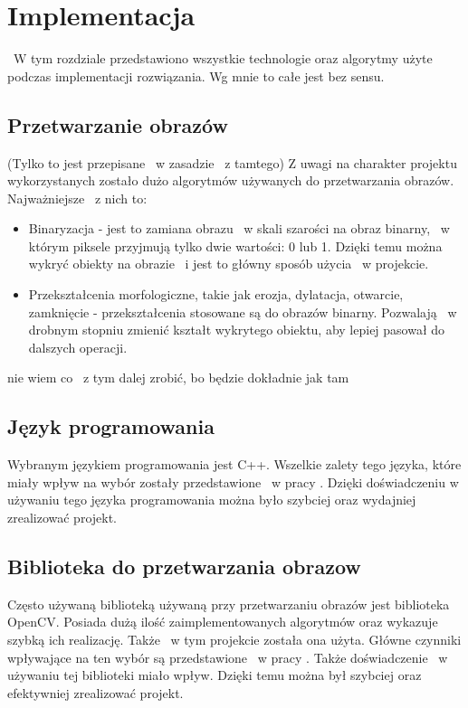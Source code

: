 \chapter{Implementacja}
\label{cha:projekt}
~W tym rozdziale przedstawiono wszystkie technologie oraz algorytmy użyte podczas implementacji rozwiązania. Wg mnie to całe jest bez sensu.

\section{Przetwarzanie obrazów}
\label{sec:przetwarzanieObrazow}
(Tylko to jest przepisane ~w zasadzie ~z tamtego)
Z uwagi na charakter projektu wykorzystanych zostało dużo algorytmów używanych do przetwarzania obrazów. Najważniejsze ~z nich to:
\begin{itemize}
\item Binaryzacja - jest to zamiana obrazu ~w skali szarości na obraz binarny, ~w którym piksele przyjmują tylko dwie wartości: 0 lub 1. Dzięki temu można wykryć obiekty na obrazie ~i jest to główny sposób użycia ~w projekcie.
\item Przekształcenia morfologiczne, takie jak erozja, dylatacja, otwarcie, zamknięcie - przekształcenia stosowane są do obrazów binarny. Pozwalają ~w drobnym stopniu zmienić kształt wykrytego obiektu, aby lepiej pasował do dalszych operacji. 
\end{itemize}

nie wiem co ~z tym dalej zrobić, bo będzie dokładnie jak tam

\section{Język programowania}
\label{sec:jezykProgramowania}
Wybranym językiem programowania jest C++. Wszelkie zalety tego języka, które miały wpływ na wybór zostały przedstawione ~w pracy \cite{Gl11}. Dzięki doświadczeniu w używaniu tego języka programowania można było szybciej oraz wydajniej zrealizować projekt.

\section{Biblioteka do przetwarzania obrazow}
\label{sec:bibliotekaObrazow}
Często używaną biblioteką używaną przy przetwarzaniu obrazów jest biblioteka OpenCV. Posiada dużą ilość zaimplementowanych algorytmów oraz wykazuje szybką ich realizację. Także ~w tym projekcie została ona użyta. Główne czynniki wpływające na ten wybór są przedstawione ~w pracy \cite{Gl11}. Także doświadczenie ~w używaniu tej biblioteki miało wpływ. Dzięki temu można był szybciej oraz efektywniej zrealizować projekt.

